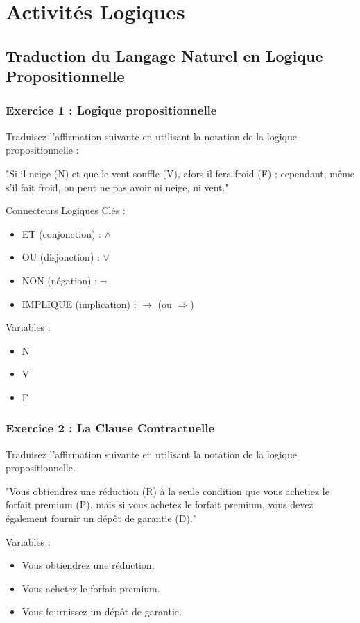 \setcounter{chapter}{3}
\chapter*{Activités Logiques}
\section*{Traduction du Langage Naturel en Logique Propositionnelle}
\subsection*{Exercice 1 : Logique propositionnelle}


Traduisez l'affirmation suivante en utilisant la notation de la logique propositionnelle :
\begin{center}
"Si il neige (N) et que le vent souffle (V), alors il fera froid (F) ; cependant, même s'il fait froid, on peut ne pas avoir ni neige, ni vent."
\end{center}
Connecteurs Logiques Clés :
\begin{itemize}
    \item ET (conjonction) : \(\land\)
    \item OU (disjonction) : \(\lor\)
    \item NON (négation) : \(\neg\)
    \item IMPLIQUE (implication) : \(\rightarrow\) (ou \(\Rightarrow\))
\end{itemize}
Variables :
\begin{itemize}
    \item N
    \item V
    \item F
\end{itemize}

\subsection*{Exercice 2 : La Clause Contractuelle}

Traduisez l'affirmation suivante en utilisant la notation de la logique propositionnelle.
\begin{center}
    "Vous obtiendrez une réduction (R) à la seule condition que vous achetiez le forfait premium (P), mais si vous achetez le forfait premium, vous devez également fournir un dépôt de garantie (D)."
\end{center}
Variables :
\begin{itemize}
    \item Vous obtiendrez une réduction.
    \item Vous achetez le forfait premium.
    \item Vous fournissez un dépôt de garantie.
\end{itemize}

